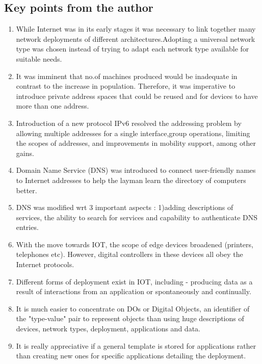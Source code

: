\documentclass{report}
\begin{document}
\begin{multicols}{1}    
    \section*{Key points from the author}
     
    \begin{enumerate}
        \item While Internet was in its early stages it was necessary to link together many network deployments of different architectures.Adopting a universal network type was chosen instead of trying to adapt each network type available for suitable needs.
        \item It was imminent that no.of machines produced would be inadequate in contrast to the increase in population. Therefore, it was imperative to introduce private address spaces that could be reused and for devices to have more than one address.
        \item Introduction of a new protocol IPv6 resolved the addressing problem by allowing multiple addresses for a single interface,group operations, limiting the scopes of addresses, and improvements in mobility support, among other gains.
        \item Domain Name Service (DNS) was introduced to connect user-friendly names to Internet addresses to help the layman learn the directory of computers better.
         \item DNS was modified wrt 3 important aspects : 1)adding descriptions of services, the ability to search for services and capability to authenticate DNS entries.
         \item With the move towards IOT, the scope of edge devices broadened (printers, telephones etc). However, digital controllers in these devices all obey the Internet protocols.
         \item Different forms of deployment exist in IOT, including - producing data as a result of interactions from an application or spontaneously and continually.
         \item It is much easier to concentrate on DOs or Digital Objects, an identifier of the "type-value" pair to represent objects than using huge descriptions of devices, network types, deployment, applications and data.
          \item It is really appreciative if a general template is stored for applications rather than creating new ones for specific applications detailing the deployment.
    \end{enumerate}
\end{multicols}
    
\end{document}
